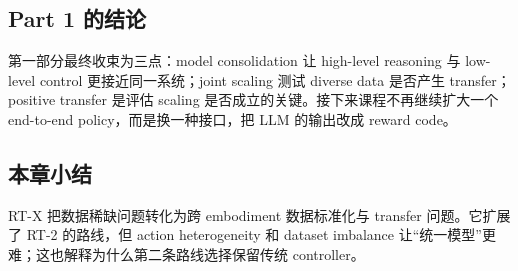 \subsection{Part 1 的结论}

第一部分最终收束为三点：model consolidation 让 high-level reasoning 与 low-level control 更接近同一系统；joint scaling 测试 diverse data 是否产生 transfer；positive transfer 是评估 scaling 是否成立的关键。接下来课程不再继续扩大一个 end-to-end policy，而是换一种接口，把 LLM 的输出改成 reward code。


\subsection{本章小结}

RT-X 把数据稀缺问题转化为跨 embodiment 数据标准化与 transfer 问题。它扩展了 RT-2 的路线，但 action heterogeneity 和 dataset imbalance 让“统一模型”更难；这也解释为什么第二条路线选择保留传统 controller。

